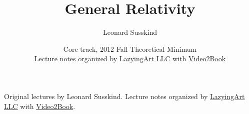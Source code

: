 \documentclass[11pt,oneside]{book}
\begin{document}
\frontmatter

\title{General Relativity}
\author{Leonard Susskind}
\date{Core track, 2012 Fall Theoretical Minimum \\ Lecture notes organized by \href{https://lazying.art}{LazyingArt LLC} with \href{https://github.com/lachlanchen/Video2Book}{Video2Book}}
\maketitle
\begin{center}
\small Original lectures by Leonard Susskind. Lecture notes organized by \href{https://lazying.art}{LazyingArt LLC} with \href{https://github.com/lachlanchen/Video2Book}{Video2Book}.
\end{center}
\clearpage
\tableofcontents
\mainmatter










\end{document}
